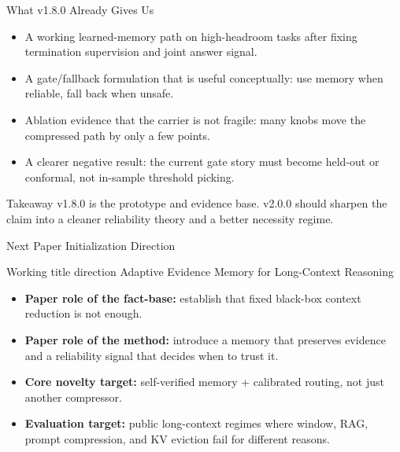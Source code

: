 \begin{frame}{What v1.8.0 Already Gives Us}
  \small
  \begin{itemize}
    \item A working learned-memory path on high-headroom tasks after fixing
      termination supervision and joint answer signal.
    \item A gate/fallback formulation that is useful conceptually: use memory when
      reliable, fall back when unsafe.
    \item Ablation evidence that the carrier is not fragile: many knobs move the
      compressed path by only a few points.
    \item A clearer negative result: the current gate story must become held-out
      or conformal, not in-sample threshold picking.
  \end{itemize}
  \begin{block}{Takeaway}
    v1.8.0 is the prototype and evidence base. v2.0.0 should sharpen the claim
    into a cleaner reliability theory and a better necessity regime.
  \end{block}
\end{frame}

\begin{frame}{Next Paper Initialization Direction}
  \small
  \begin{block}{Working title direction}
    Adaptive Evidence Memory for Long-Context Reasoning
  \end{block}
  \begin{itemize}
    \item \textbf{Paper role of the fact-base:} establish that fixed black-box
      context reduction is not enough.
    \item \textbf{Paper role of the method:} introduce a memory that preserves
      evidence and a reliability signal that decides when to trust it.
    \item \textbf{Core novelty target:} self-verified memory + calibrated routing,
      not just another compressor.
    \item \textbf{Evaluation target:} public long-context regimes where window,
      RAG, prompt compression, and KV eviction fail for different reasons.
  \end{itemize}
\end{frame}

